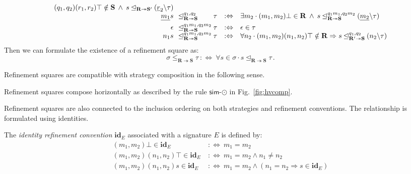 \documentclass[acmsmall,nonacm]{acmart}
\newcommand{\kw}[1]{\ensuremath{ \mathsf{#1} }}
\newcommand{\idsc}{\mathbf{id}} %
\begin{document}
\begin{definition}
\[\begin{array}{r@{\:\:\:}l@{\:}l@{\quad:\Leftrightarrow\quad}l}
      (q_1, q_2)(r_1, r_2)\top \notin \mathbf{S} \:\wedge\:
      s \unlhd_{\mathbf{R} \twoheadrightarrow \mathbf{S}'}
      (\underline{r}_2 \backslash \tau )
  \\
  \underline{m_1} s &
  \unlhd_{\mathbf{R} \twoheadrightarrow \mathbf{S}}^{q_1,q_2} &
  \tau &
    \exists m_2 \cdot
      (m_1, m_2) \bot \in \mathbf{R} \:\wedge\:
      s \unlhd_{\mathbf{R} \twoheadrightarrow \mathbf{S}}^{q_1m_1,q_2m_2}
        (\underline{m_2} \backslash \tau )
  \\[1ex]
  \epsilon &
  \unlhd_{\mathbf{R} \twoheadrightarrow \mathbf{S}}^{q_1m_1,q_2m_2} &
  \tau &
    \epsilon \in \tau
  \\
  n_1 s &
  \unlhd_{\mathbf{R} \twoheadrightarrow \mathbf{S}}^{q_1m_1,q_2m_2} &
  \tau &
    \forall n_2 \cdot
      (m_1,m_2)(n_1, n_2)\top \notin \mathbf{R} \Rightarrow
      s \unlhd_{\mathbf{R}' \twoheadrightarrow \mathbf{S}}^{q_1,q_2}
        (n_2 \backslash \tau)
\end{array}
\]
Then we can formulate the existence of a refinement square as:
\[
  \sigma \le_{\mathbf{R} \twoheadrightarrow \mathbf{S}} \tau
    \::\Leftrightarrow\:
  \forall s \in \sigma \cdot
    s \unlhd_{\mathbf{R} \twoheadrightarrow \mathbf{S}} \tau
  \,.
\]
\end{definition}

Refinement squares are compatible with strategy composition
in the following sense.

\begin{theorem}%
Refinement squares compose horizontally
as described by the rule $\kw{sim}$-$\odot$
in Fig.~\ref{fig:hvcomp}.
\end{theorem}

Refinement squares are also connected to
the inclusion ordering on both strategies and refinement conventions.
The relationship is formulated using identities.

\begin{definition}
The \emph{identity refinement convention} $\idsc_E$
associated with a signature $E$ is defined by:
\begin{align*}
  (m_1, m_2) \bot \in \idsc_E &\::\Leftrightarrow\:
    m_1 = m_2 \\
  (m_1, m_2) (n_1, n_2) \top \in \idsc_E &\::\Leftrightarrow\:
    m_1 = m_2 \wedge n_1 \neq n_2 \\
  (m_1, m_2) (n_1, n_2) s \in \idsc_E &\::\Leftrightarrow\:
    m_1 = m_2 \wedge (n_1 = n_2 \Rightarrow s \in \idsc_E)
\end{align*}
\end{definition}
\end{document}
